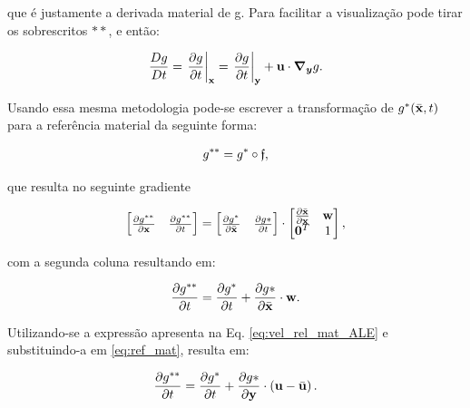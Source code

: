 \documentclass[tese_patricia]{subfiles}%
\begin{document}
\noindent que é justamente a derivada material de g. Para facilitar a visualização pode tirar os sobrescritos $**$, e então:

\begin{align}
	\frac{Dg}{Dt} = \left . \frac{\partial g}{\partial t} \right|_{\mathbf{x}} = \left . \frac{\partial g}{\partial t} \right|_{\mathbf{y}} + \mathbf{u} \cdot \boldsymbol{\nabla_y} g. \label{eq:der_mat}
\end{align}

Usando essa mesma metodologia pode-se escrever a transformação de $g^{*}(\bar{\mathbf{x}},t)$ para a referência material da seguinte forma:


\begin{align}
	g^{**} = g^{*}  \circ \mathfrak{f},
\end{align}

\noindent que resulta no seguinte gradiente

\begin{align}
	\begin{bmatrix}
		\frac{\partial {g^{**}}}{\partial {\mathbf{x}}} & \frac{\partial {g^{**}}}{\partial t} \\
	\end{bmatrix}
	=
	\begin{bmatrix}
		\frac{\partial {g^*}}{\partial \bar{\mathbf{x}}} & \frac{\partial {g*}}{\partial t} 
	\end{bmatrix}
	\cdot
	\begin{bmatrix}
		\frac{\partial {\bar{\mathbf{x}}}}{\partial {\mathbf{x}}} & \mathbf{w} \\
		\mathbf{0}^T & 1 \\
	\end{bmatrix},
\end{align}


\noindent com a segunda coluna resultando em:

\begin{align}
	\frac{\partial g^{**}}{\partial t} = \frac{\partial g^*}{\partial t} + \frac{\partial g*}{\partial \bar{\mathbf{x}}} \cdot \mathbf{w}. \label{eq:ref_mat}
\end{align}

Utilizando-se a expressão apresenta na Eq. \ref{eq:vel_rel_mat_ALE} e substituindo-a em \ref{eq:ref_mat}, resulta em:

\begin{align}
	\frac{\partial g^{**}}{\partial t} = \frac{\partial g^*}{\partial t} + \frac{\partial g*}{\partial \mathbf{y}} \cdot \left(\mathbf{u} - \bar{\mathbf{u}} \right). 
\end{align}
\end{document}

